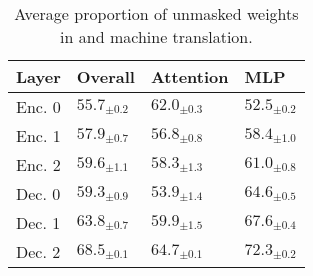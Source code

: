 \begin{table}[t]
    \centering
    \small
    \begin{tabular}{llll}\toprule
    Layer & Overall & Attention & MLP \\\midrule
    Enc. 0 & $55.7_{\pm 0.2}$ & $62.0_{\pm 0.3}$ & $52.5_{\pm 0.2}$\\
    Enc. 1 & $57.9_{\pm 0.7}$ & $56.8_{\pm 0.8}$ & $58.4_{\pm 1.0}$\\ 
    Enc. 2 & $59.6_{\pm 1.1}$ & $58.3_{\pm 1.3}$ & $61.0_{\pm 0.8}$\\
    Dec. 0 & $59.3_{\pm 0.9}$ & $53.9_{\pm 1.4}$ & $64.6_{\pm 0.5}$\\
    Dec. 1 & $63.8_{\pm 0.7}$ & $59.9_{\pm 1.5}$ & $67.6_{\pm 0.4}$\\
    Dec. 2 & $68.5_{\pm 0.1}$ & $64.7_{\pm 0.1}$ & $72.3_{\pm 0.2}$\\
    \bottomrule
    \end{tabular}
    \caption{Average proportion of unmasked weights in \dobjppiobjpp{} and machine translation.}
    \label{tab:results_subnetwork_ex}
\end{table}